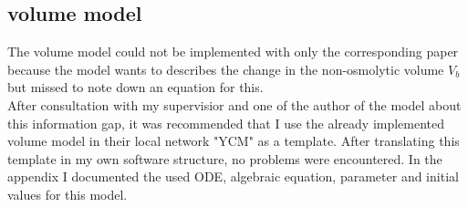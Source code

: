 \subsection{volume model}
The volume model could not be implemented with only the corresponding paper because the model wants to describes the change in the non-osmolytic volume $V_b$ but missed to note down an equation for this.\\
After consultation with my supervisior and one of the author of the model about this information gap, it was recommended that I use the already implemented volume model in their local network "YCM" as a template. After translating this template in my own software structure, no problems were encountered. In the appendix I documented the used ODE, algebraic equation, parameter and initial values for this model. 
